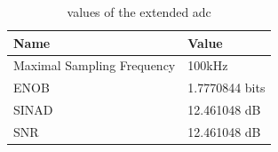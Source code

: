 \begin{table}[!h]
	\centering
	\begin{tabular}{|l|l|}
		\hline
		Name & Value \\
		\hline
		Maximal Sampling Frequency & 100kHz \\
		ENOB & 1.7770844 bits \\
		SINAD & 12.461048 dB \\
		SNR & 12.461048 dB \\
		\hline
	\end{tabular}
	\caption{values of the extended adc}
	\label{table:valuesExtendedADC}
\end{table}